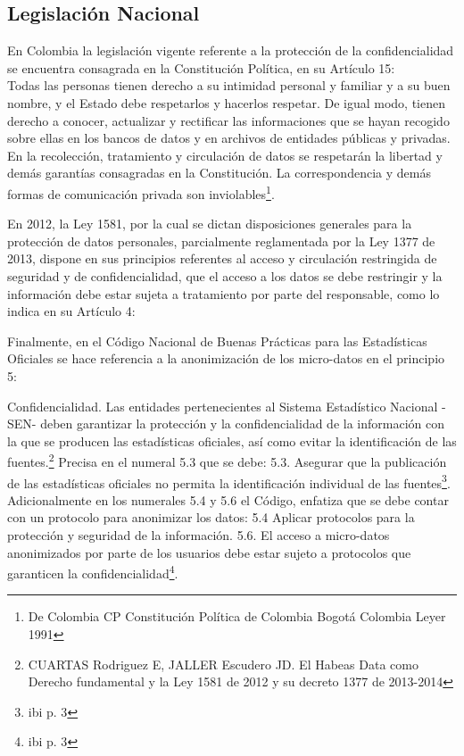 \documentclass[a4paper,openright,12pt]{book}
\theoremstyle{definition}
\theoremstyle{remark}
\begin{document}
\subsection{Legislación Nacional}

En Colombia la legislación vigente referente a la protección de la confidencialidad se encuentra consagrada en la Constitución Política, en su Artículo 15:\\
Todas las personas tienen derecho a su intimidad personal y familiar y a su buen nombre, y el Estado debe respetarlos y hacerlos respetar. De igual modo, tienen derecho a conocer, actualizar y rectificar las informaciones que se hayan recogido sobre ellas en los bancos de datos y en archivos de entidades públicas y privadas. En la recolección, tratamiento y circulación de datos se respetarán la libertad y demás garantías consagradas en la Constitución. La correspondencia y demás formas de comunicación privada son inviolables\footnote{De Colombia CP Constitución Política de Colombia Bogotá Colombia Leyer 1991}.

En 2012, la Ley 1581, por la cual se dictan disposiciones generales para la protección de datos personales, parcialmente reglamentada por la Ley 1377 de 2013, dispone en sus principios referentes al acceso y circulación restringida de seguridad y de confidencialidad, que el acceso a los datos se debe restringir y la información debe estar sujeta a tratamiento por parte del responsable, como lo indica en su Artículo 4:

Finalmente, en el Código Nacional de Buenas Prácticas para las Estadísticas Oficiales se hace referencia a la anonimización de los micro-datos en el principio 5:

Confidencialidad. Las entidades pertenecientes al Sistema Estadístico Nacional -SEN- deben garantizar la protección y la confidencialidad de la información con la que se producen las estadísticas oficiales, así como evitar la identificación de las fuentes.\footnote{CUARTAS Rodriguez E, JALLER Escudero JD. El Habeas Data como Derecho fundamental y la Ley 1581 de 2012 y su decreto 1377 de 2013-2014}
Precisa en el numeral 5.3 que se debe:
5.3. Asegurar que la publicación de las estadísticas oficiales no permita la identificación individual de las fuentes\footnote{ibi p. 3}.
Adicionalmente en los numerales 5.4 y 5.6 el Código, enfatiza que se debe contar con un protocolo para anonimizar los datos:
5.4 Aplicar protocolos para la protección y seguridad de la información. 5.6. El acceso a micro-datos anonimizados por parte de los usuarios debe estar sujeto a protocolos que garanticen la confidencialidad\footnote{ibi p. 3}.
\end{document}
